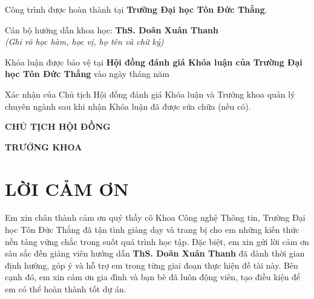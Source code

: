 \documentclass[12pt, a4paper]{report}
\newcommand{\supervisor}{ThS. Doãn Xuân Thanh}
\begin{document}
\begin{titlepage}
  \noindent
  Công trình được hoàn thành tại \textbf{Trường Đại học Tôn Đức Thắng}.

  \vspace{0.3cm}
  \noindent
  Cán bộ hướng dẫn khoa học: \textbf{\supervisor}\\
  \hspace*{\fill}\textit{(Ghi rõ học hàm, học vị, họ tên và chữ ký)}

  \vspace{2.5cm}
  \noindent
  Khóa luận được bảo vệ tại \textbf{Hội đồng đánh giá Khóa luận của Trường Đại học
  Tôn Đức Thắng} vào ngày \makebox[1cm]{\dotfill} tháng \makebox[1cm]{\dotfill}
  năm \makebox[1.5cm]{\dotfill}

  \vspace{1.5cm}
  \noindent
  Xác nhận của Chủ tịch Hội đồng đánh giá Khóa luận và Trưởng khoa quản lý chuyên
  ngành sau khi nhận Khóa luận đã được sửa chữa (nếu có).

  \vspace{1.2cm}
  \noindent
  \begin{minipage}[t]{0.5\textwidth}
    \centering
    \textbf{CHỦ TỊCH HỘI ĐỒNG}
  \end{minipage}%
  \begin{minipage}[t]{0.5\textwidth}
    \centering
    \textbf{TRƯỞNG KHOA}
  \end{minipage}
\end{titlepage}

\chapter*{LỜI CẢM ƠN}

Em xin chân thành cảm ơn quý thầy cô Khoa Công nghệ Thông tin, Trường Đại học Tôn Đức
Thắng đã tận tình giảng dạy và trang bị cho em những kiến thức nền tảng vững chắc trong
suốt quá trình học tập. Đặc biệt, em xin gửi lời cảm ơn sâu sắc đến giảng viên hướng dẫn
\textbf{\supervisor} đã dành thời gian định hướng, góp ý và hỗ trợ em trong từng giai đoạn
thực hiện đề tài này. Bên cạnh đó, em xin cảm ơn gia đình và bạn bè đã luôn động viên, tạo
điều kiện để em có thể hoàn thành tốt dự án.
\end{document}
